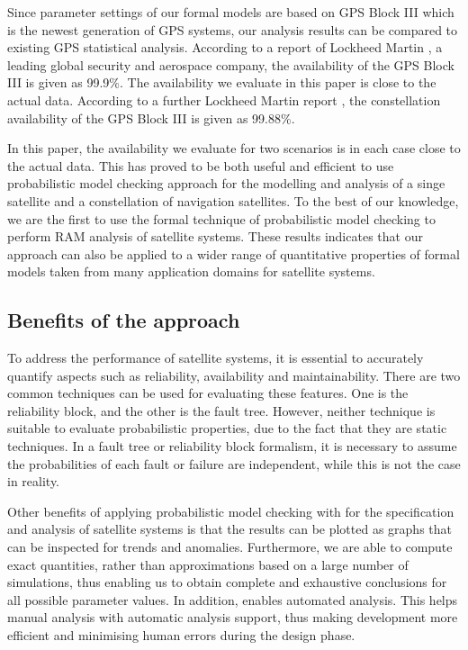 \documentclass[preprint,12pt]{qrei}
\begin{document}
Since parameter settings of our formal models are based on GPS Block III which is the newest generation of GPS systems, our analysis results can be compared to existing GPS statistical analysis. According to a report of Lockheed Martin \cite{Jac13}, a leading global security and aerospace company, the availability of the GPS Block III is given as 99.9\%. The availability we evaluate in this paper is close to the actual data. According to a further Lockheed Martin report \cite{Sha11}, the constellation availability of the GPS Block III is given as 99.88\%.

In this paper, the availability we evaluate for two scenarios is in each case close to the actual data. This has proved to be both useful and efficient to use probabilistic model checking approach for the modelling and analysis of a singe satellite and a constellation of navigation satellites. To the best of our knowledge, we are the first to use the formal technique of probabilistic model checking to perform RAM analysis of satellite systems. These results indicates that our approach can also be applied to a wider range of quantitative properties of formal models taken from many application domains for satellite systems.

\subsection{Benefits of the approach}

To address the performance of satellite systems, it is essential to accurately quantify aspects such as reliability, availability and maintainability. There are two common techniques can be used for evaluating these features. One is the reliability block, and the other is the fault tree. However, neither technique is suitable to evaluate probabilistic properties, due to the fact that they are static techniques. In a fault tree or reliability block formalism, it is necessary to assume the probabilities of each fault or failure are independent, while this is not the case in reality.



Other benefits of applying probabilistic model checking with  for the specification and analysis of satellite systems is that the results can be plotted as graphs that can be inspected for trends and anomalies. Furthermore, we are able to compute exact quantities, rather than approximations based on a large number of simulations, thus enabling us to obtain complete and exhaustive conclusions for all possible parameter values. In addition,  enables automated analysis. This helps manual analysis with automatic analysis support, thus making development more efficient and minimising human errors during the design phase.
\end{document}
